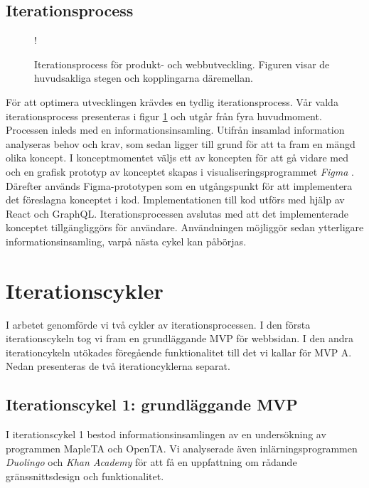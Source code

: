 \subsection{Iterationsprocess}

\begin{figure}
    \begin{center}
         {!} {
        
        }
    \end{center}
    \caption{Iterationsprocess för produkt-  och webbutveckling. Figuren visar de huvudsakliga stegen och kopplingarna däremellan.}
    \label{fig:iteration_process}
\end{figure}

För att optimera utvecklingen krävdes en tydlig iterationsprocess. Vår valda iterationsprocess presenteras i figur \ref{fig:iteration_process} och utgår från fyra huvudmoment. Processen inleds med en informationsinsamling. Utifrån insamlad information analyseras behov och krav, som sedan ligger till grund för att ta fram en mängd olika koncept. I konceptmomentet väljs ett av koncepten för att gå vidare med och en grafisk prototyp av konceptet skapas i visualiseringsprogrammet \emph{Figma} \cite{figma}. Därefter används Figma-prototypen som en utgångspunkt för att implementera det föreslagna konceptet i kod. Implementationen till kod utförs med hjälp av React och GraphQL. Iterationsprocessen avslutas med att det implementerade konceptet tillgängliggörs för användare. Användningen möjliggör sedan ytterligare informationsinsamling, varpå nästa cykel kan påbörjas. 


\section{Iterationscykler}

I arbetet genomförde vi två cykler av iterationsprocessen. I den första iterationscykeln tog vi fram en grundläggande MVP för webbsidan. I den andra iterationcykeln utökades föregående funktionalitet till det vi kallar för MVP A. Nedan presenteras de två iterationcyklerna separat.

\subsection{Iterationscykel 1: grundläggande MVP}
I iterationscykel 1 bestod informationsinsamlingen av en undersökning av programmen MapleTA och OpenTA. Vi analyserade även inlärningsprogrammen \emph{Duolingo} \cite{duolingo} och \emph{Khan Academy} \cite{khanacademy} för att få en uppfattning om rådande gränssnittsdesign och funktionalitet.

